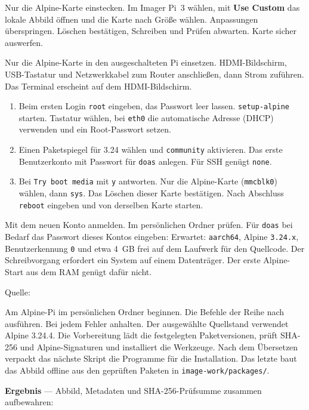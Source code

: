 Nur die Alpine-Karte einstecken. Im Imager Pi~3 wählen, mit \textbf{Use Custom} das lokale Abbild öffnen und die Karte nach Größe wählen. Anpassungen überspringen. Löschen bestätigen, Schreiben und Prüfen abwarten. Karte sicher auswerfen.

Nur die Alpine-Karte in den ausgeschalteten Pi einsetzen. HDMI-Bildschirm, USB-Tastatur und Netzwerkkabel zum Router anschließen, dann Strom zuführen. Das Terminal erscheint auf dem HDMI-Bildschirm.
\begin{enumerate}
\item Beim ersten Login \texttt{root} eingeben, das Passwort leer lassen. \texttt{setup-alpine} starten. Tastatur wählen, bei \texttt{eth0} die automatische Adresse (DHCP) verwenden und ein Root-Passwort setzen.
\item Einen Paketspiegel für 3.24 wählen und \texttt{community} aktivieren. Das erste Benutzerkonto mit Passwort für \texttt{doas} anlegen. Für SSH genügt \texttt{none}.
\item Bei \texttt{Try boot media} mit \texttt{y} antworten. Nur die Alpine-Karte (\texttt{mmcblk0}) wählen, dann \texttt{sys}. Das Löschen dieser Karte bestätigen. Nach Abschluss \texttt{reboot} eingeben und von derselben Karte starten.
\end{enumerate}
Mit dem neuen Konto anmelden. Im persönlichen Ordner prüfen. Für \texttt{doas} bei Bedarf das Passwort dieses Kontos eingeben:
\envCommands
Erwartet: \texttt{aarch64}, Alpine \texttt{3.24.x}, Benutzerkennung \texttt{0} und etwa 4~GB frei auf dem Laufwerk für den Quellcode. Der Schreibvorgang erfordert ein System auf einem Datenträger. Der erste Alpine-Start aus dem RAM genügt dafür nicht.

Quelle: \sourceURL

Am Alpine-Pi im persönlichen Ordner beginnen. Die Befehle der Reihe nach ausführen. Bei jedem Fehler anhalten.
\buildCommands
Der ausgewählte Quellstand verwendet Alpine 3.24.4. Die Vorbereitung lädt die festgelegten Paketversionen, prüft SHA-256 und Alpine-Signaturen und installiert die Werkzeuge. Nach dem Übersetzen verpackt das nächste Skript die Programme für die Installation. Das letzte baut das Abbild offline aus den geprüften Paketen in \texttt{image-work/packages/}.

\textbf{Ergebnis} — Abbild, Metadaten und SHA-256-Prüfsumme zusammen aufbewahren:
\outputFiles

